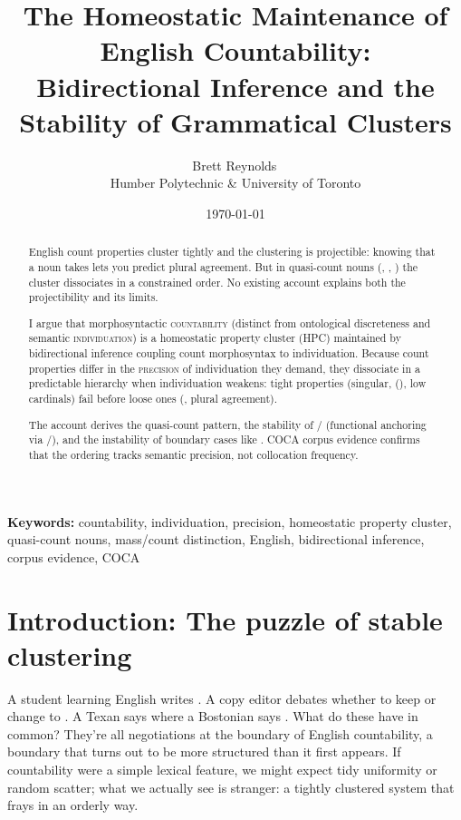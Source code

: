 \documentclass[12pt,a4paper]{article}
\title{The Homeostatic Maintenance of English Countability:\\Bidirectional Inference and the Stability of Grammatical Clusters}
\author{Brett Reynolds\,\orcidlink{0000-0003-0073-7195}\\Humber Polytechnic \& University of Toronto}
\date{\today}
\begin{document}
\maketitle

\noindent\textbf{Keywords:} countability, individuation, precision, homeostatic property cluster, quasi-count nouns, mass/count distinction, English, bidirectional inference, corpus evidence, COCA

\begin{abstract}
English count properties cluster tightly and the clustering is projectible: knowing that a noun takes  lets you predict plural agreement. But in quasi-count nouns (, , ) the cluster dissociates in a constrained order. No existing account explains both the projectibility and its limits.

I argue that morphosyntactic \textsc{countability} (distinct from ontological discreteness and semantic \textsc{individuation}) is a homeostatic property cluster (HPC) maintained by bidirectional inference coupling count morphosyntax to individuation. Because count properties differ in the \textsc{precision} of individuation they demand, they dissociate in a predictable hierarchy when individuation weakens: tight properties (singular, (), low cardinals) fail before loose ones (, plural agreement).

The account derives the quasi-count pattern, the stability of / (functional anchoring via /), and the instability of boundary cases like . COCA corpus evidence confirms that the ordering tracks semantic precision, not collocation frequency.
\end{abstract}

\section{Introduction: The puzzle of stable clustering}

A student learning English writes . A copy editor debates whether to keep  or change to . A Texan says  where a Bostonian says . What do these have in common? They're all negotiations at the boundary of English countability, a boundary that turns out to be more structured than it first appears. If countability were a simple lexical feature, we might expect tidy uniformity or random scatter; what we actually see is stranger: a tightly clustered system that frays in an orderly way.
\end{document}
